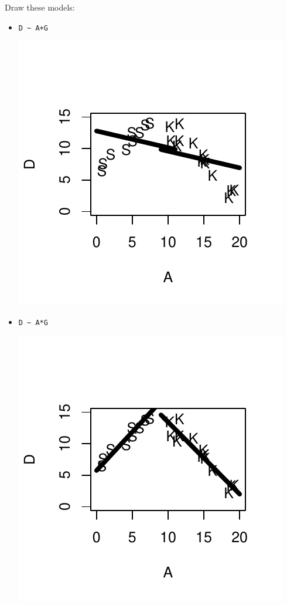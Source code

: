 Draw these models:
\begin{itemize}
  \item \verb-D ~ A+G-
    
\begin{AnswerText}
\includegraphics{Figures/fig-fig-4-3-q1}
\end{AnswerText}

 \item \verb=D ~ A*G=

\begin{AnswerText}
\includegraphics{Figures/fig-fig-4-3-q2}
\end{AnswerText}


\end{itemize}
